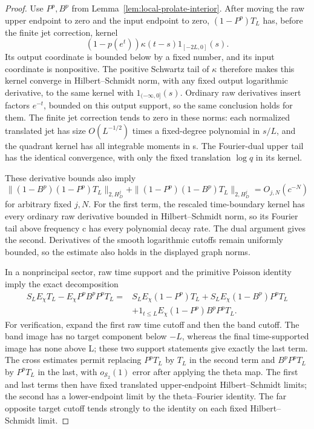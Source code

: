 \begin{proof}
Use $P^p,B^p$ from Lemma~\ref{lem:local-prolate-interior}.
After moving the raw upper endpoint to zero and the input endpoint
to zero, $(1-P^p)T_L$ has, before the finite jet correction, kernel
\[
       (1-p(e^t))\kappa(t-s)1_{[-2L,0]}(s).
\]
Its output coordinate is bounded below by a fixed number, and its
input coordinate is nonpositive.  The positive Schwartz tail of
$\kappa$ therefore makes this kernel converge in Hilbert--Schmidt
norm, with any fixed output logarithmic derivative, to the same
kernel with $1_{(-\infty,0]}(s)$.
Ordinary raw derivatives insert factors $e^{-t}$, bounded on this
output support, so the same conclusion holds for them.
The finite jet correction tends to zero in these norms: each
normalized translated jet has size $O(L^{-1/2})$ times a fixed-degree
polynomial in $s/L$, and the quadrant kernel has all integrable
moments in s.  The Fourier-dual upper tail has the identical
convergence, with only the fixed translation $\log q$ in its kernel.

These derivative bounds also imply
\[
 \|(1-B^p)(1-P^p)T_L\|_{2,H_D^j}
 +\|(1-P^p)(1-B^p)T_L\|_{2,H_D^j}=O_{j,N}(c^{-N})
\]
for arbitrary fixed $j,N$.  For the first term, the rescaled
time-boundary kernel has every ordinary raw derivative bounded in
Hilbert--Schmidt norm, so its Fourier tail above frequency c has
every polynomial decay rate.  The dual argument gives the second.
Derivatives of the smooth logarithmic cutoffs remain uniformly
bounded, so the estimate also holds in the displayed graph norms.

In a nonprincipal sector, raw time support and the primitive Poisson
identity imply the exact decomposition
\[
 \begin{split}
 S_LE_\chi T_L-E_\chi P^pB^pP^pT_L
 ={}&S_LE_\chi(1-P^p)T_L
     +S_LE_\chi(1-B^p)P^pT_L\\
    &+1_{t\leq L}E_\chi(1-P^p)B^pP^pT_L.
 \end{split}
\]
For verification, expand the first raw time cutoff and then the
band cutoff.  The band image has no target component below $-L$,
whereas the final time-supported image has none above L; these
two support statements give exactly the last term.
The cross estimates permit replacing $P^pT_L$ by $T_L$ in the
second term and $B^pP^pT_L$ by $P^pT_L$ in the last, with
$o_{\mathcal S_2}(1)$ error after applying the theta map.
The first and last terms then have fixed translated upper-endpoint
Hilbert--Schmidt limits; the second has a lower-endpoint limit by
the theta--Fourier identity.  The far opposite target cutoff tends
strongly to the identity on each fixed Hilbert--Schmidt limit.


\end{proof}
